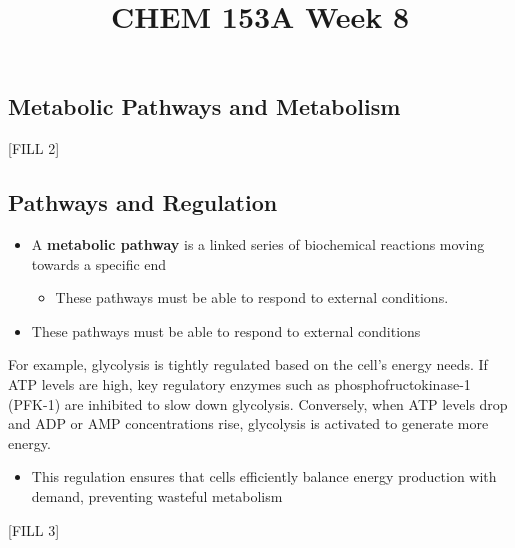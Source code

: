 \documentclass[10pt]{article}
\title{CHEM 153A Week 8}
\begin{document}
\maketitle

\subsection*{Metabolic Pathways and Metabolism}
\begin{center}
    [FILL 2]
\end{center}

\subsection*{Pathways and Regulation}
\begin{itemize}
    \item A \textbf{metabolic pathway} is a linked series of biochemical reactions moving towards a specific end
    \begin{itemize}
        \item These pathways must be able to respond to external conditions.
    \end{itemize}
    \item These pathways must be able to respond to external conditions
\end{itemize}
For example, glycolysis is tightly regulated based on the cell's energy needs.  If ATP levels are high, key regulatory enzymes such as phosphofructokinase-1 (PFK-1) are inhibited to slow down glycolysis.  Conversely, when ATP levels drop and ADP or AMP concentrations rise, glycolysis is activated to generate more energy.
\begin{itemize}
    \item This regulation ensures that cells efficiently balance energy production with demand, preventing wasteful metabolism
\end{itemize}
\begin{center}
    [FILL 3]
\end{center}
\end{document}

